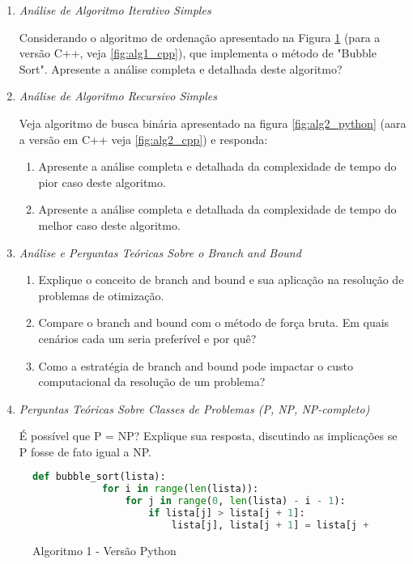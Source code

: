 \documentclass{article}
\begin{document}
\begin{enumerate}
    

\item \textit{Análise de Algoritmo Iterativo Simples}

Considerando o algoritmo de ordenação apresentado na Figura \ref{fig:alg1_pyhton} (para a versão C++, veja \ref{fig:alg1_cpp}), que implementa o método de "Bubble Sort". Apresente a análise completa e detalhada deste algoritmo? 

\item \textit{Análise de Algoritmo Recursivo Simples}

Veja algoritmo de busca binária apresentado na figura \ref{fig:alg2_python}  (aara a versão em C++ veja \ref{fig:alg2_cpp}) e responda:

\begin{enumerate}
\item Apresente a análise completa e detalhada da complexidade de tempo do pior caso deste algoritmo. 
\item Apresente a análise completa e detalhada da complexidade de tempo do melhor caso deste algoritmo. 
\end{enumerate}

\item \textit{Análise e Perguntas Teóricas Sobre o Branch and Bound}

\begin{enumerate}
\item  Explique o conceito de branch and bound e sua aplicação na resolução de problemas de otimização. 
\item  Compare o branch and bound com o método de força bruta. Em quais cenários cada um seria preferível e por quê? 
\item  Como a estratégia de branch and bound pode impactar o custo computacional da resolução de um problema? 
\end{enumerate}

\item \textit{Perguntas Teóricas Sobre Classes de Problemas (P, NP, NP-completo)}

É possível que P = NP? Explique sua resposta, discutindo as implicações se P fosse de fato igual a NP. 

\end{enumerate}


\begin{figure} [!ht]
    \begin{lstlisting}[language=Python]
        def bubble_sort(lista):
            for i in range(len(lista)):
                for j in range(0, len(lista) - i - 1):
                    if lista[j] > lista[j + 1]:
                        lista[j], lista[j + 1] = lista[j + 1], lista[j]
        \end{lstlisting}
        \label{fig:alg1_pyhton}
        \caption{Algoritmo 1 - Versão Python}
\end{figure}
\end{document}
